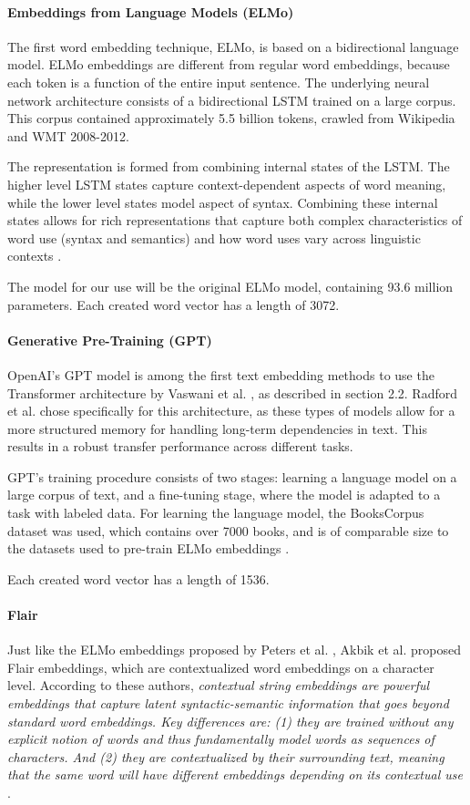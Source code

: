 \paragraph{Embeddings from Language Models (ELMo)}
The first word embedding technique, ELMo, is based on a bidirectional language model. 
ELMo embeddings are different from regular word embeddings, because each token is a function of the entire input sentence.
The underlying neural network architecture consists of a bidirectional LSTM trained on a large corpus.
This corpus contained approximately 5.5 billion tokens, crawled from Wikipedia and WMT 2008-2012.

The representation is formed from combining internal states of the LSTM. 
The higher level LSTM states capture context-dependent aspects of word meaning, while the lower level states model aspect of syntax.
Combining these internal states allows for rich representations that capture both complex characteristics of word use (syntax and semantics) and how word uses vary across linguistic contexts \cite{peters2018}.

The model for our use will be the original ELMo model, containing 93.6 million parameters.
Each created word vector has a length of 3072. 

\paragraph{Generative Pre-Training (GPT)}
OpenAI's GPT model is among the first text embedding methods to use the Transformer architecture by Vaswani et al. \cite{vaswani2017}, as described in section 2.2.
Radford et al. chose specifically for this architecture, as these types of models allow for a more structured memory for handling long-term dependencies in text.
This results in a robust transfer performance across different tasks. 

GPT's training procedure consists of two stages: learning a language model on a large corpus of text, and a fine-tuning stage, where the model is adapted to a task with labeled data.
For learning the language model, the BooksCorpus dataset was used, which contains over 7000 books, and is of comparable size to the datasets used to pre-train ELMo embeddings \cite{radford2018}.

Each created word vector has a length of 1536.

\paragraph{Flair}
Just like the ELMo embeddings proposed by Peters et al. \cite{peters2018}, Akbik et al. proposed Flair embeddings, which are contextualized word embeddings on a character level.
According to these authors, \textit{contextual string embeddings are powerful embeddings that capture latent syntactic-semantic information that goes beyond standard word embeddings. 
Key differences are: (1) they are trained without any explicit notion of words and thus fundamentally model words as sequences of characters. 
And (2) they are contextualized by their surrounding text, meaning that the same word will have different embeddings depending on its contextual use} \cite{flairembedding}. 

